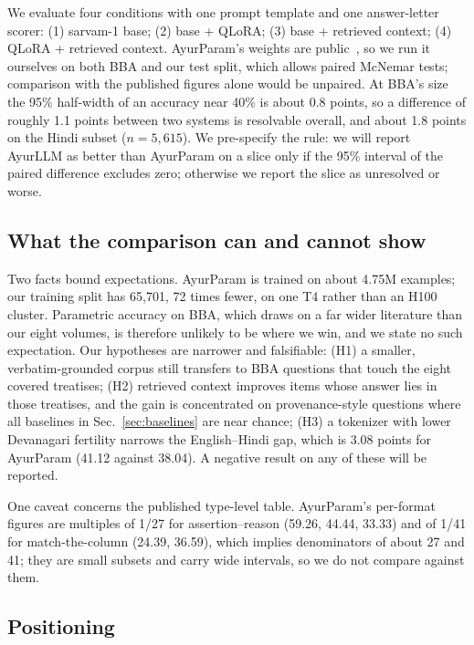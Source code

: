 \documentclass[10pt,twocolumn,letterpaper]{article}
\begin{document}
We evaluate four conditions with one prompt template and one answer-letter scorer:
(1) sarvam-1 base; (2) base + QLoRA; (3) base + retrieved context; (4) QLoRA +
retrieved context. AyurParam's weights are public~\cite{ayurparamhf}, so we run it
ourselves on both BBA and our test split, which allows paired McNemar tests;
comparison with the published figures alone would be unpaired. At BBA's size the
95\% half-width of an accuracy near 40\% is about 0.8 points, so a difference of
roughly 1.1 points between two systems is resolvable overall, and about 1.8 points
on the Hindi subset ($n=5{,}615$). We pre-specify the rule: we will report AyurLLM
as better than AyurParam on a slice only if the 95\% interval of the paired
difference excludes zero; otherwise we report the slice as unresolved or worse.

\subsection{What the comparison can and cannot show}

Two facts bound expectations. AyurParam is trained on about 4.75M examples; our
training split has 65{,}701, 72 times fewer, on one T4 rather than an H100
cluster. Parametric accuracy on BBA, which draws on a far wider literature than
our eight volumes, is therefore unlikely to be where we win, and we state no such
expectation. Our hypotheses are narrower and falsifiable: (H1) a smaller,
verbatim-grounded corpus still transfers to BBA questions that touch the eight
covered treatises; (H2) retrieved context improves items whose answer lies in
those treatises, and the gain is concentrated on provenance-style questions where
all baselines in Sec.~\ref{sec:baselines} are near chance; (H3) a tokenizer with
lower Devanagari fertility narrows the English--Hindi gap, which is 3.08 points
for AyurParam (41.12 against 38.04). A negative result on any of these will be
reported.

One caveat concerns the published type-level table. AyurParam's per-format
figures are multiples of 1/27 for assertion--reason (59.26, 44.44, 33.33) and of
1/41 for match-the-column (24.39, 36.59), which implies denominators of about 27
and 41; they are small subsets and carry wide intervals, so we do not compare
against them.

\subsection{Positioning}
\end{document}
